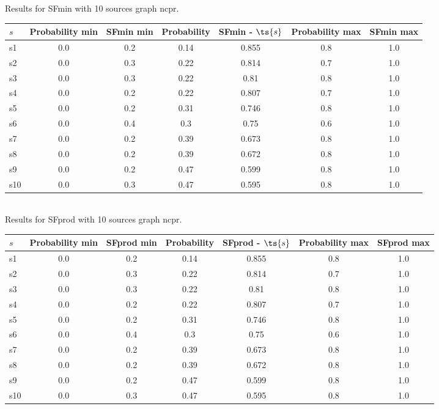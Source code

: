 \documentclass{article}
\begin{document}
\noindent Results for SFmin with 10 sources graph ncpr.

\noindent\begin{tabular}{|l|c|c|c|c|c|c|}
\hline
$s$& Probability min & SFmin min & Probability & SFmin - $\ts{s}$ & Probability max & SFmin max\\
\hline
s1 &0.0 & 0.2 & 0.14 & 0.855 & 0.8 & 1.0\\
\hline
s2 &0.0 & 0.3 & 0.22 & 0.814 & 0.7 & 1.0\\
\hline
s3 &0.0 & 0.3 & 0.22 & 0.81 & 0.8 & 1.0\\
\hline
s4 &0.0 & 0.2 & 0.22 & 0.807 & 0.7 & 1.0\\
\hline
s5 &0.0 & 0.2 & 0.31 & 0.746 & 0.8 & 1.0\\
\hline
s6 &0.0 & 0.4 & 0.3 & 0.75 & 0.6 & 1.0\\
\hline
s7 &0.0 & 0.2 & 0.39 & 0.673 & 0.8 & 1.0\\
\hline
s8 &0.0 & 0.2 & 0.39 & 0.672 & 0.8 & 1.0\\
\hline
s9 &0.0 & 0.2 & 0.47 & 0.599 & 0.8 & 1.0\\
\hline
s10 &0.0 & 0.3 & 0.47 & 0.595 & 0.8 & 1.0\\
\hline
\end{tabular}\\

\noindent Results for SFprod with 10 sources graph ncpr.

\noindent\begin{tabular}{|l|c|c|c|c|c|c|}
\hline
$s$& Probability min & SFprod min & Probability & SFprod - $\ts{s}$ & Probability max & SFprod max\\
\hline
s1 &0.0 & 0.2 & 0.14 & 0.855 & 0.8 & 1.0\\
\hline
s2 &0.0 & 0.3 & 0.22 & 0.814 & 0.7 & 1.0\\
\hline
s3 &0.0 & 0.3 & 0.22 & 0.81 & 0.8 & 1.0\\
\hline
s4 &0.0 & 0.2 & 0.22 & 0.807 & 0.7 & 1.0\\
\hline
s5 &0.0 & 0.2 & 0.31 & 0.746 & 0.8 & 1.0\\
\hline
s6 &0.0 & 0.4 & 0.3 & 0.75 & 0.6 & 1.0\\
\hline
s7 &0.0 & 0.2 & 0.39 & 0.673 & 0.8 & 1.0\\
\hline
s8 &0.0 & 0.2 & 0.39 & 0.672 & 0.8 & 1.0\\
\hline
s9 &0.0 & 0.2 & 0.47 & 0.599 & 0.8 & 1.0\\
\hline
s10 &0.0 & 0.3 & 0.47 & 0.595 & 0.8 & 1.0\\
\hline
\end{tabular}\\
\end{document}
